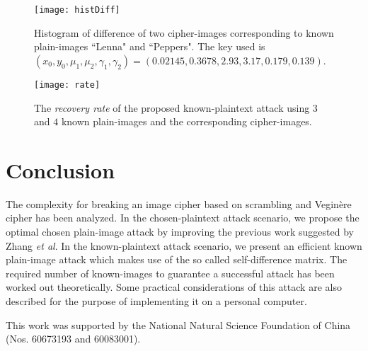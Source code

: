 \documentclass[smallextended, final]{svjour3}          \smartqed
\begin{document}
\begin{figure}[!htb]
\centering
\texttt{[image: histDiff]}
\caption{Histogram of difference of two cipher-images corresponding to known plain-images ``Lenna" and ``Peppers". The key used is $(x_0, y_0, \mu_1, \mu_2, \gamma_1, \gamma_2) = (0.02145, 0.3678, 2.93, 3.17, 0.179, 0.139)$.}
\label{fig:histCipher}
\end{figure}

\begin{figure}[!htb]
\centering
\texttt{[image: rate]}
\caption{The \textit{recovery rate} of the proposed known-plaintext attack using $3$ and $4$ known plain-images and the corresponding cipher-images.}
\label{fig:kpa2}
\end{figure}

\section{Conclusion}
The complexity for breaking an image cipher based on scrambling and Vegin{\`e}re cipher has been analyzed.
In the chosen-plaintext attack scenario, we propose the optimal chosen plain-image attack by improving the previous work suggested by Zhang \textit{et al}.
In the known-plaintext attack scenario, we present an efficient known plain-image attack which makes use of the so called self-difference matrix. The required number of known-images
to guarantee a successful attack has been worked out theoretically. Some practical considerations of this attack are also described for the purpose of
implementing it on a personal computer.

\begin{acknowledgements}
This work was supported by the National Natural Science Foundation of China (Nos. 60673193 and 60083001).
\end{acknowledgements}



\end{document}
